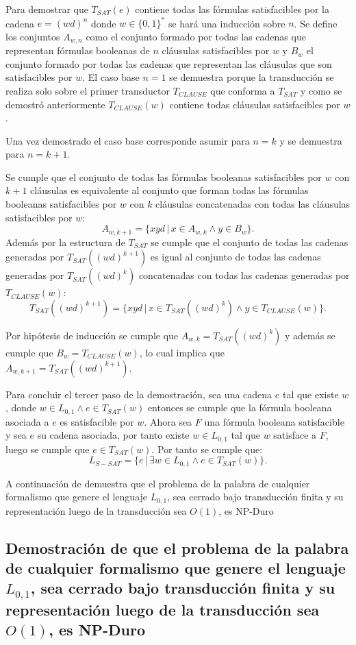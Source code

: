 Para demostrar que $T_{SAT}(e)$ contiene todas las fórmulas satisfacibles por la cadena $e=(wd)^n$ donde
$w\in\{0,1\}^*$ se hará una inducción sobre $n$. Se define los conjuntos $A_{w,n}$ como el conjunto
formado por todas las cadenas que representan fórmulas booleanas de $n$ cláusulas satisfacibles por
$w$ y $B_w$ el conjunto formado por todas las cadenas que representan las cláusulas que son satisfacibles
por $w$. El caso base $n=1$ se demuestra porque la transducción se realiza solo sobre el primer transductor
$T_{CLAUSE}$ que conforma a $T_{SAT}$ y como se demostró anteriormente $T_{CLAUSE}(w)$ contiene todas cláusulas satisfacibles por $w$.

Una vez demostrado el caso base corresponde asumir para $n=k$ y se demuestra para $n=k+1$.

Se cumple que
el conjunto de todas las fórmulas booleanas satisfacibles por $w$ con $k+1$ cláusulas es equivalente
al conjunto que forman todas las fórmulas booleanas satisfacibles por $w$ con $k$ cláusulas concatenadas con todas
las cláusulas satisfacibles por $w$:
$$A_{w,k+1}=\{xyd\,|\,x\in A_{w,k} \wedge y\in B_w\}.$$
Además por la estructura de $T_{SAT}$ se cumple que el conjunto de todas las cadenas
generadas por $T_{SAT}((wd)^{k+1})$ es igual al conjunto de todas las cadenas
generadas por $T_{SAT}((wd)^{k})$ concatenadas con todas las cadenas generadas por $T_{CLAUSE}(w)$:
$$T_{SAT}((wd)^{k+1})=\{xyd\,|\,x\in T_{SAT}((wd)^{k}) \wedge y\in T_{CLAUSE}(w)\}.$$

Por hipótesis de inducción se cumple que $A_{w,k}=T_{SAT}((wd)^{k})$ y además se cumple que $B_w=T_{CLAUSE}(w)$, lo cual implica que $A_{w,k+1}=T_{SAT}((wd)^{k+1})$.

Para concluir el tercer paso de la demostración, sea una cadena $e$ tal que existe $w$, donde $w \in L_{0,1} \wedge e \in T_{SAT}(w)$ entonces
se cumple que la fórmula booleana asociada a $e$ es satisfacible por $w$. Ahora sea $F$ una fórmula
booleana satisfacible y sea $e$ su cadena asociada, por tanto existe $w\in L_{0,1}$ tal que $w$ satisface a $F$, luego se cumple que $e\in T_{SAT}(w)$. Por tanto se cumple que:
$$L_{S-SAT} = \{e\,|\,\exists w \in L_{0,1} \wedge e \in T_{SAT}(w) \}.$$

A continuación de demuestra que el problema de la palabra de cualquier formalismo que genere el lenguaje $L_{0,1}$, sea cerrado bajo transducción finita y su representación luego de la transducción sea $O(1)$, es NP-Duro


\subsection{Demostración de que el problema de la palabra de cualquier formalismo que genere el lenguaje $L_{0,1}$, sea cerrado bajo transducción finita y su representación luego de la transducción sea $O(1)$, es NP-Duro}

